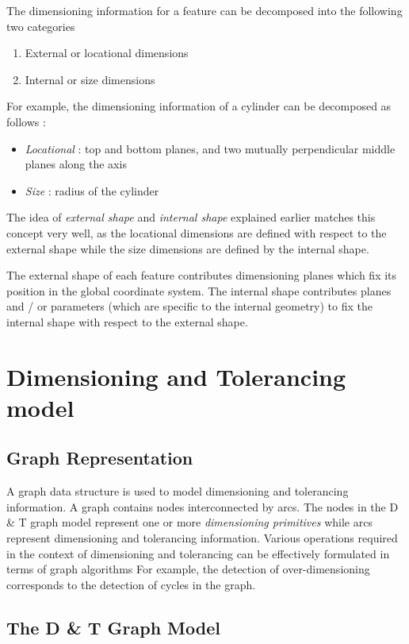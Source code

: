 	The dimensioning information for a feature can be decomposed into the
	following two categories
		\begin{enumerate}
		\item
		External or locational dimensions
		\item
		Internal or size dimensions
		\end{enumerate}

	For example, the dimensioning information of a cylinder can be decomposed as
	follows :
		\begin{itemize}
		\item
		{\em Locational} : top and bottom planes, and two mutually
		perpendicular middle planes along the axis
		\item
		{\em Size} : radius of the cylinder
		\end{itemize}
	The idea of {\em external shape} and {\em internal shape} explained
	earlier matches this concept very well, as the locational dimensions are
	defined with respect to the external shape while the size dimensions
	are defined by the internal shape.

	The external shape of each feature contributes dimensioning planes which 
	fix its position in the global coordinate system.
	The internal shape contributes planes and / or parameters (which are 
	specific to the 
	internal geometry) to fix the internal shape with respect to the external 
	shape.

	\section{Dimensioning and Tolerancing model}

		\subsection{Graph Representation}
		
		A graph data structure is used to model dimensioning and tolerancing
		information. A graph contains nodes interconnected by arcs. The nodes
		in the D \& T graph model represent one or more 
		{\em dimensioning primitives} while arcs represent dimensioning and
		tolerancing information. Various operations required in the context of
		dimensioning and tolerancing can be effectively formulated in terms
		of graph algorithms For example, the detection of over-dimensioning
		corresponds to the detection of cycles in the graph.

		\subsection{The D \& T Graph Model}

